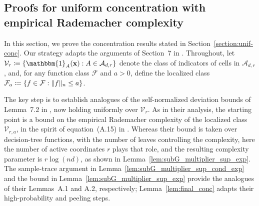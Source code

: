 \documentclass[11pt]{article}
\theoremstyle{plain}
\theoremstyle{definition}
\theoremstyle{remark}
\theoremstyle{plain}
\newcommand{\bx}{\mathbf{x}}
\DeclarePairedDelimiter{\norm}{\|}{\|}
\newcommand{\partfunc}{\mathcal{V}}
\newcommand{\funcclass}{\mathcal{F}}
\newcommand{\1}{\mathbbm{1}}
\begin{document}
\subsection{Proofs for uniform concentration with empirical Rademacher complexity}
In this section, we prove the concentration results stated in
Section~\ref{section:unif-conc}. Our strategy adapts the arguments of
Section~7 in \citet{xu2026statistical}. Throughout, let
$\partfunc_r \coloneqq \{\1_A(\bx) : A \in \mathcal{A}_{d,r}\}$ denote
the class of indicators of cells in $\mathcal{A}_{d,r}$, and, for any
function class $\funcclass$ and $a > 0$, define the localized class
$\funcclass_a \coloneqq \{f \in \funcclass : \norm{f}_n \leq a\}$.

The key step is to establish analogues of the self-normalized deviation
bounds of Lemma~7.2 in \citet{xu2026statistical}, now holding uniformly
over $\partfunc_r$. As in their analysis, the starting point is a bound
on the empirical Rademacher complexity of the localized class
$\partfunc_{r,a}$, in the spirit of equation~(A.15) in
\citet{xu2026statistical}. Whereas their bound is taken over
decision-tree functions, with the number of leaves controlling the
complexity, here the number of active coordinates $r$ plays that role,
and the resulting complexity parameter is $r\log(nd)$, as shown in
Lemma~\ref{lem:subG_multiplier_sup_exp}.
The sample-trace argument in Lemma~\ref{lem:subG_multiplier_sup_cond_exp}
and the bound in Lemma~\ref{lem:subG_multiplier_sup_exp} provide the
analogues of their Lemmas~A.1 and A.2, respectively;
Lemma~\ref{lem:final_conc} adapts their high-probability and peeling steps.
\end{document}
